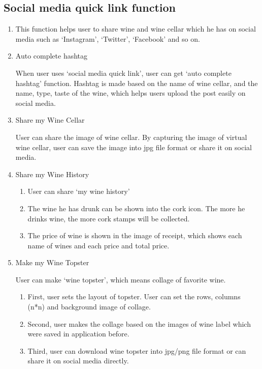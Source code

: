 \documentclass[conference]{IEEEtran}
\numberwithin{figure}{subsection}
\begin{document}
\subsection{\textbf{Social media quick link function}}
\begin{enumerate}
    \item This function helps user to share wine and wine cellar which he
has on social media such as ‘Instagram’, ‘Twitter’, ‘Facebook’
and so on.

\item Auto complete hashtag


When user uses ‘social media quick link’, user can get ‘auto
complete hashtag’ function. Hashtag is made based on the
name of wine cellar, and the name, type, taste of the wine,
which helps users upload the post easily on social media.
\item Share my Wine Cellar

  User can share the image of wine cellar. By capturing the
image of virtual wine cellar, user can save the image into jpg
file format or share it on social media.

\item Share my Wine History

\begin{enumerate}
    \item User can share ‘my wine history’
    \item The wine he has drunk can be shown into the cork icon.
The more he drinks wine, the more cork stamps will be
collected.
    \item The price of wine is shown in the image of receipt, which
shows each name of wines and each price and total price.
\end{enumerate}

\item Make my Wine Topster

User can make ‘wine topster’, which means collage of
favorite wine.
\begin{enumerate}
    \item First, user sets the layout of topster. User can set the
rows, columns (n*n) and background image of collage.
\item Second, user makes the collage based on the images
of wine label which were saved in application before.
\item Third, user can download wine topster into jpg/png
file format or can share it on social media directly.
\end{enumerate}
\end{enumerate}
\end{document}
